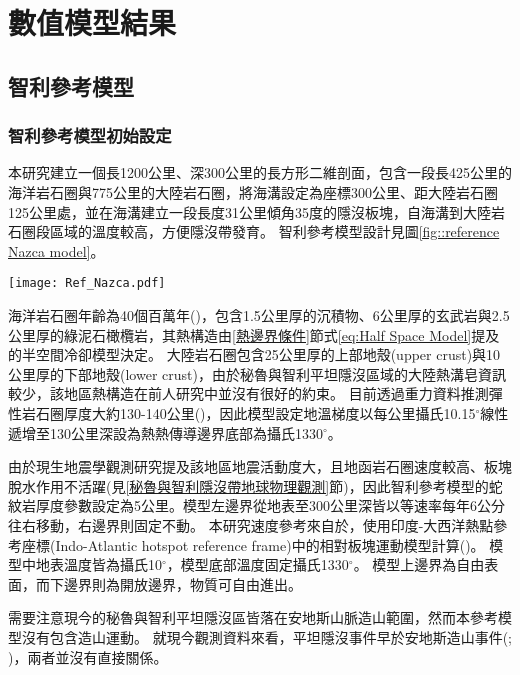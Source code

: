 
\chapter{數值模型結果}

\section{智利參考模型}
\subsection{智利參考模型初始設定}\label{智利參考模型初始模型設定}
本研究建立一個長1200公里、深300公里的長方形二維剖面，包含一段長425公里的海洋岩石圈與775公里的大陸岩石圈，將海溝設定為座標300公里、距大陸岩石圈125公里處，並在海溝建立一段長度31公里傾角35度的隱沒板塊，自海溝到大陸岩石圈段區域的溫度較高，方便隱沒帶發育。
智利參考模型設計見圖\ref{fig::reference Nazca model}。

\begin{figure*}[hb]
    \centering
    \texttt{[image: Ref\_Nazca.pdf]}
    \caption[智利參考模型設計與邊界條件示意圖]{智利參考模型設計與邊界條件示意圖}
    \label{fig::reference Nazca model}
\end{figure*}

海洋岩石圈年齡為40個百萬年(\citealp{muller2019})，包含1.5公里厚的沉積物、6公里厚的玄武岩與2.5公里厚的綠泥石橄欖岩，其熱構造由\ref{熱邊界條件}節式\ref{eq:Half Space Model}提及的半空間冷卻模型決定。
大陸岩石圈包含25公里厚的上部地殼(upper crust)與10公里厚的下部地殼(lower crust)，由於秘魯與智利平坦隱沒區域的大陸熱溝皂資訊較少，該地區熱構造在前人研究中並沒有很好的約束。
目前透過重力資料推測彈性岩石圈厚度大約130-140公里(\citealp{perez2008})，因此模型設定地溫梯度以每公里攝氏10.15$^{\circ}$線性遞增至130公里深設為熱熱傳導邊界底部為攝氏1330$^{\circ}$。

由於現生地震學觀測研究提及該地區地震活動度大，且地函岩石圈速度較高、板塊脫水作用不活躍(見\ref{秘魯與智利隱沒帶地球物理觀測}節)，因此智利參考模型的蛇紋岩厚度參數設定為5公里。模型左邊界從地表至300公里深皆以等速率每年6公分往右移動，右邊界則固定不動。
本研究速度參考來自於\citet{o2005uncertainties}，使用印度-大西洋熱點參考座標(Indo-Atlantic hotspot reference frame)中的相對板塊運動模型計算(\citealp{schellart2008global})。
模型中地表溫度皆為攝氏10$^{\circ}$，模型底部溫度固定攝氏1330$^{\circ}$。
模型上邊界為自由表面，而下邊界則為開放邊界，物質可自由進出。

需要注意現今的秘魯與智利平坦隱沒區皆落在安地斯山脈造山範圍，然而本參考模型沒有包含造山運動。
就現今觀測資料來看，平坦隱沒事件早於安地斯造山事件(\citealp{chen2019southward}; \citealp{hu2021southward})，兩者並沒有直接關係。


